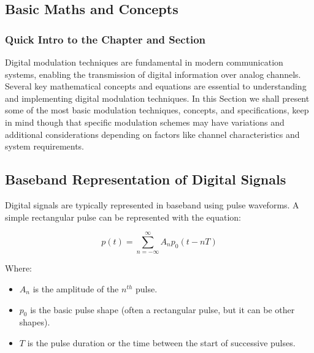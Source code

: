 \documentclass[../../../../DMCC-My-Notebook]{subfiles}
\begin{document}
	\ifSubfilesClassLoaded{ \pagestyle{fancy} }{}
	
	
	
	\subsection{Basic Maths and Concepts}
		
		\subsubsection{Quick Intro to the Chapter and Section}
			Digital modulation techniques are fundamental in modern communication systems, enabling the transmission of digital information over analog channels. Several key mathematical concepts and equations are essential to understanding and implementing digital modulation techniques. In this Section we shall present some of the most basic modulation techniques, concepts, and specifications, keep in mind though that specific modulation schemes may have variations and additional considerations depending on factors like channel characteristics and system requirements. \linebreak
	
		
		\subsubsection{}
		
		\subsection{Baseband Representation of Digital Signals}
	    	Digital signals are typically represented in baseband using pulse waveforms. A simple rectangular pulse can be represented with the equation:
	    	
	    	\begin{equation}
	    		p(t) = \sum_{n=-\infty}^{\infty} A_n p_0(t - nT)
	    	\end{equation}\label{eqn:baseband_rep}
	    	
	    	Where:
	    	\begin{itemize}[leftmargin=1cm]
	    		\item $A_n$ is the amplitude of the $n^{th}$ pulse.
	    		\item $p_0$ is the basic pulse shape (often a rectangular pulse, but it can be other shapes).
	    		\item $T$ is the pulse duration or the time between the start of successive pulses.
	    	\end{itemize}
	    	
\end{document}
